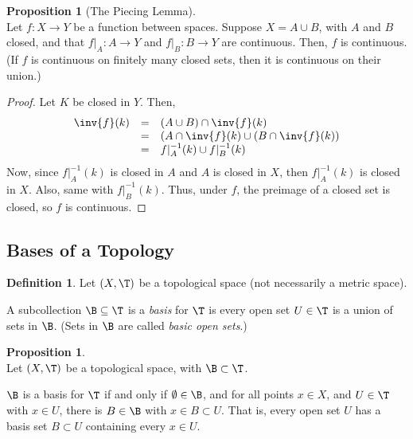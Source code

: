 \documentclass[a5paper]{article}
\theoremstyle{definition}%
\newtheorem{proposition}[theorem]{Proposition}
\newtheorem*{definition*}{Definition}
\numberwithin{exercise}{section}
\theoremstyle{remark}%
\begin{document}
\pagebreak

\begin{highlight}
\begin{proposition}[The Piecing Lemma]\mbox{}\\
Let $f:X\to Y$ be a function between spaces. Suppose $X=A\cup B$, with $A$ and $B$ closed, and that $f|_A:A\to Y$ and $f|_B:B\to Y$ are continuous. Then, $f$ is continuous. (If $f$ is continuous on finitely many closed sets, then it is continuous on their union.)
\end{proposition}
\end{highlight}
\begin{proof}
Let $K$ be closed in $Y$. Then, 
\[
\begin{array}{rcl}
\inv{f}(k)&=&(A\cup B)\cap \inv{f}(k)\\
&=&(A\cap \inv{f}(k)\cup(B\cap \inv{f}(k))\\
&=&f|_A^{-1}(k)\cup f|_B^{-1}(k)\\
\end{array}
\]
Now, since $f|_A^{-1}(k)$ is closed in $A$ and $A$ is closed in $X$, then $f|_A^{-1}(k)$ is closed in $X$. Also, same with $f|_B^{-1}(k)$. Thus, under $f$, the preimage of a closed set is closed, so $f$ is continuous. 
\end{proof}

\subsection{Bases of a Topology}

\begin{definition*}
Let $(X,\T)$ be a topological space (not necessarily a metric space). 

A subcollection $\B \subseteq \T$ is a \emph{basis} for $\T$ is every open set $U\in \T$ is a union of sets in $\B$. (Sets in $\B$ are called \emph{basic open sets}.)
\end{definition*}

\begin{highlight}
\begin{proposition}\mbox{}\\
Let $(X,\T)$ be a topological space, with $\B\subset\T$. 

$\B$ is a basis for $\T$ if and only if $\emptyset\in \B$, and for all points $x\in X$, and $U\in \T$ with $x\in U$, there is $B\in\B$ with $x\in B\subset U$. That is, every open set $U$ has a basis set $B\subset U$ containing every $x\in U$. 
\end{proposition}
\end{highlight}
\end{document}
